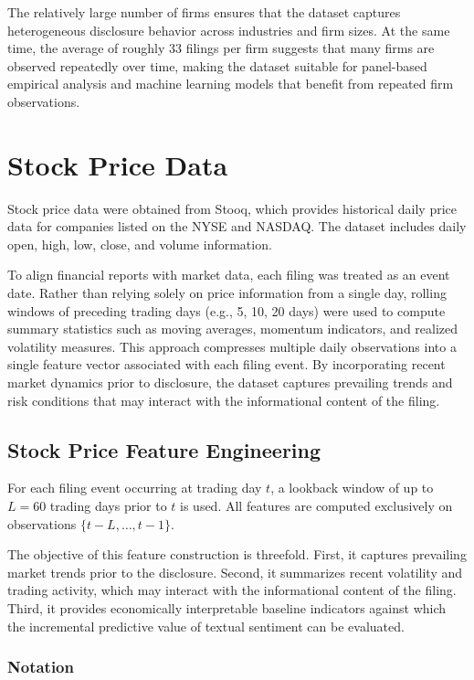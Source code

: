 The relatively large number of firms ensures that the dataset captures heterogeneous disclosure behavior across industries and firm sizes. At the same time, the average of roughly 33 filings per firm suggests that many firms are observed repeatedly over time, making the dataset suitable for panel-based empirical analysis and machine learning models that benefit from repeated firm observations.

\section{Stock Price Data}

Stock price data were obtained from Stooq\cite{stooq_data}, which provides historical daily price data for companies listed on the NYSE and NASDAQ. 
The dataset includes daily open, high, low, close, and volume information.

To align financial reports with market data, each filing was treated as an event date. 
Rather than relying solely on price information from a single day, rolling windows of preceding trading days (e.g., 5, 10, 20 days) were used to compute summary statistics such as moving averages, momentum indicators, and realized volatility measures. 
This approach compresses multiple daily observations into a single feature vector associated with each filing event. 
By incorporating recent market dynamics prior to disclosure, the dataset captures prevailing trends and risk conditions that may interact with the informational content of the filing.

\subsection{Stock Price Feature Engineering}

For each filing event occurring at trading day $t$, a lookback window of up to $L=60$ trading days prior to $t$ is used. All features are computed exclusively on observations $\{t-L, \dots, t-1\}$.

The objective of this feature construction is threefold. First, it captures prevailing market trends prior to the disclosure. Second, it summarizes recent volatility and trading activity, which may interact with the informational content of the filing. Third, it provides economically interpretable baseline indicators against which the incremental predictive value of textual sentiment can be evaluated.

\subsubsection*{Notation}

